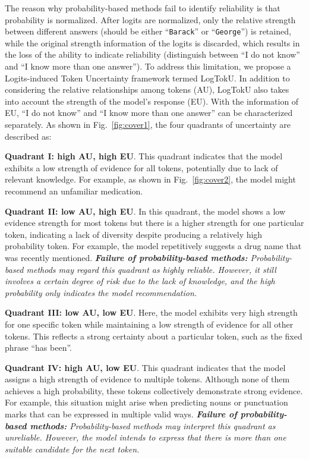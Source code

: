 The reason why probability-based methods fail to identify reliability is that probability is normalized. After logits are normalized, only the relative strength between different answers (should be either ``\texttt{Barack}'' or ``\texttt{George}'') is retained, while the original strength information of the logits is discarded, which results in the loss of the ability to indicate reliability (distinguish between ``I do not know'' and ``I know more than one answer''). To address this limitation, we propose a Logits-induced Token Uncertainty framework termed LogTokU. In addition to considering the relative relationships among tokens (AU), LogTokU also takes into account the strength of the model's response (EU). With the information of EU, ``I do not know'' and ``I know more than one answer'' can be characterized separately. As shown in Fig.~\ref{fig:cover1}, the four quadrants of uncertainty are described as:

\textbf{Quadrant I: high AU, high EU}.\quad
This quadrant indicates that the model exhibits a low strength of evidence for all tokens, potentially due to lack of relevant knowledge. For example, as shown in Fig.~\ref{fig:cover2}, the model might recommend an unfamiliar medication.

\textbf{Quadrant II: low AU, high EU}.\quad
In this quadrant, the model shows a low evidence strength for most tokens but there is a higher strength for one particular token, indicating a lack of diversity despite producing a relatively high probability token. For example, the model repetitively suggests a drug name that was recently mentioned.
\emph{\textbf{Failure of probability-based methods:} Probability-based methods may regard this quadrant as highly reliable. However, it still involves a certain degree of risk due to the lack of knowledge, and the high probability only indicates the model recommendation.}

\textbf{Quadrant III: low AU, low EU}.\quad
Here, the model exhibits very high strength for one specific token while maintaining a low strength of evidence for all other tokens. This reflects a strong certainty about a particular token, such as the fixed phrase ``has been''.

\textbf{Quadrant IV: high AU, low EU}.\quad
This quadrant indicates that the model assigns a high strength of evidence to multiple tokens. Although none of them achieves a high probability, these tokens collectively demonstrate strong evidence. For example, this situation might arise when predicting nouns or punctuation marks that can be expressed in multiple valid ways.
\emph{\textbf{Failure of probability-based methods:} Probability-based methods may interpret this quadrant as unreliable. However, the model intends to express that there is more than one suitable candidate for the next token.}

